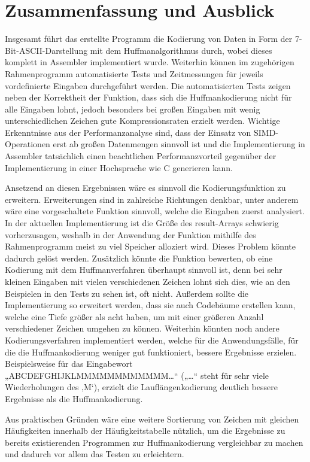 \documentclass[course=erap]{aspdoc}
\begin{document}
\section{Zusammenfassung und Ausblick}

Insgesamt führt das erstellte Programm die Kodierung von Daten in Form der 7-Bit-ASCII-Darstellung mit dem Huffmanalgorithmus durch, wobei dieses komplett in Assembler implementiert wurde. Weiterhin können im zugehörigen Rahmenprogramm automatisierte Tests und Zeitmessungen für jeweils vordefinierte Eingaben durchgeführt werden. Die automatisierten Tests zeigen neben der Korrektheit der Funktion, dass sich die Huffmankodierung nicht für alle Eingaben lohnt, jedoch besonders bei großen Eingaben mit wenig unterschiedlichen Zeichen gute Kompressionsraten erzielt werden. Wichtige Erkenntnisse aus der Performanzanalyse sind, dass der Einsatz von SIMD-Operationen erst ab großen Datenmengen sinnvoll ist und die Implementierung in Assembler tatsächlich einen beachtlichen Performanzvorteil gegenüber der Implementierung in einer Hochsprache wie C generieren kann.


Ansetzend an diesen Ergebnissen wäre es sinnvoll die Kodierungsfunktion zu erweitern. Erweiterungen sind in zahlreiche Richtungen denkbar, unter anderem wäre eine vorgeschaltete Funktion sinnvoll, welche die Eingaben zuerst analysiert. In der aktuellen Implementierung ist die Größe des result-Arrays schwierig vorherzusagen, weshalb in der Anwendung der Funktion mithilfe des Rahmenprogramm meist zu viel Speicher alloziert wird. Dieses Problem könnte dadurch gelöst werden. Zusätzlich könnte die Funktion bewerten, ob eine Kodierung mit dem Huffmanverfahren überhaupt sinnvoll ist, denn bei sehr kleinen Eingaben mit vielen verschiedenen Zeichen lohnt sich dies, wie an den Beispielen in den Tests zu sehen ist, oft nicht. Außerdem sollte die Implementierung so erweitert werden, dass sie auch Codebäume erstellen kann, welche eine Tiefe größer als acht haben, um mit einer größeren Anzahl verschiedener Zeichen umgehen zu können.
Weiterhin könnten noch andere Kodierungsverfahren implementiert werden, welche für die Anwendungsfälle, für die die Huffmankodierung weniger gut funktioniert, bessere Ergebnisse erzielen. Beispielsweise für das Eingabewort „ABCDEFGHIJKLMMMMMMMMMMMM…“ („…“ steht für sehr viele Wiederholungen des ‚M‘), erzielt die Lauflängenkodierung deutlich bessere Ergebnisse als die Huffmankodierung.

Aus praktischen Gründen wäre eine weitere Sortierung von Zeichen mit gleichen Häufigkeiten innerhalb der Häufigkeitstabelle nützlich, um die Ergebnisse zu bereits existierenden Programmen zur Huffmankodierung vergleichbar zu machen und dadurch vor allem das Testen zu erleichtern.



{}
\end{document}
